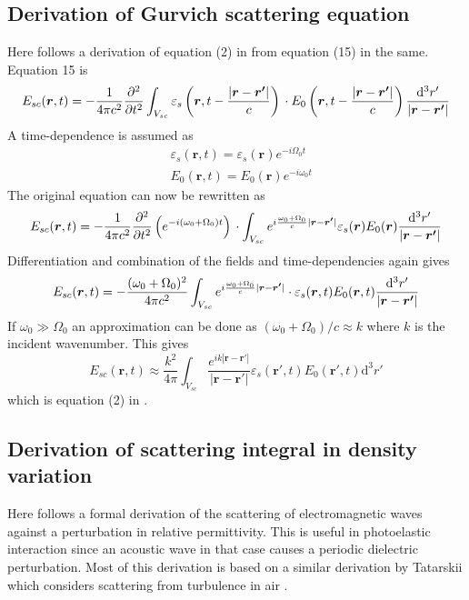 \documentclass[10pt,a4paper,draft]{scrartcl}
\begin{document}
	\subsection{Derivation of Gurvich scattering equation}
	Here follows a derivation of equation (2) in \cite{Gurvich1987} from equation (15) in the same. Equation 15 is
	\begin{equation*}
		E_{sc} (\bm{r},t) = -\frac{1}{4\pi c^2} \frac{\partial^2}{\partial t^2} \int_{V_{sc}}
		\varepsilon_s\left( \bm{r}, t - \frac{\left|\bm{r}-\bm{r'}\right|}{c} \right)\\
		\cdot E_0 \left( \bm{r}, t - \frac{\left|\bm{r}-\bm{r'}\right|}{c} \right)
		\frac{\mathrm{d}^3r'}{\left|\bm{r}-\bm{r'}\right|}
	\end{equation*}
	A time-dependence is assumed as
	\begin{align*}
		&\varepsilon_s(\bm{r}, t) = \varepsilon_s(\bm{r}) e^{-i\Omega_0 t} \\
		&E_0(\bm{r},t) = E_0(\bm{r}) e^{-i\omega_0 t}
	\end{align*}
	The original equation can now be rewritten as
	\begin{equation*}
	E_{sc} (\bm{r},t) = -\frac{1}{4\pi c^2}
	\frac{\partial^2}{\partial t^2} \left( e^{-i(\omega_0 + \Omega_0)t} \right) \\
	\cdot \int_{V_{sc}} e^{i\frac{\omega_0 + \Omega_0}{c} |\bm{r}-\bm{r'}|}
	\varepsilon_s(\bm{r}) E_0 (\bm{r})
	\frac{\mathrm{d}^3r'}{\left|\bm{r}-\bm{r'}\right|}
	\end{equation*}
	Differentiation and combination of the fields and time-dependencies again gives
	\begin{equation*}
	E_{sc} (\bm{r},t) = -\frac{(\omega_0 + \Omega_0)^2}{4\pi c^2}
	\int_{V_{sc}} e^{i\frac{\omega_0 + \Omega_0}{c} |\bm{r}-\bm{r'}|}\\
	\cdot \varepsilon_s(\bm{r},t) E_0 (\bm{r},t)
	\frac{\mathrm{d}^3r'}{\left|\bm{r}-\bm{r'}\right|}
	\end{equation*}
	If $\omega_0 \gg \Omega_0$ an approximation can be done as $(\omega_0 + \Omega_0)/c \approx k$ where $k$ is the incident wavenumber. This gives
	\begin{equation*}
	E_{sc}(\bm{r},t) \approx \frac{k^2}{4\pi} \int_{V_{sc}} \frac{e^{ik \left| \bm{r}-\bm{r'} \right| }}{ \left| \bm{r}-\bm{r'} \right| } \varepsilon_s (\bm{r'},t) E_0 (\bm{r'},t) \mathrm{d}^3r'
	\end{equation*}
	which is equation (2) in \cite{Gurvich1987}.
	
	\subsection{Derivation of scattering integral in density variation}
	Here follows a formal derivation of the scattering of electromagnetic waves against a perturbation in relative permittivity. This is useful in photoelastic interaction since an acoustic wave in that case causes a periodic dielectric perturbation. Most of this derivation is based on a similar derivation by Tatarskii which considers scattering from turbulence in air \cite{Tatarskii1971}.
	
\end{document}
